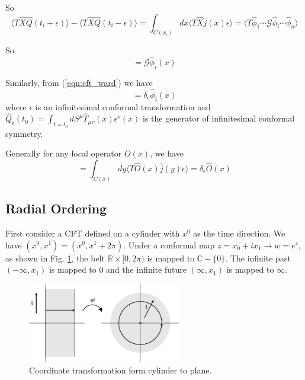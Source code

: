 \documentclass[12pt]{book}
\begin{document}
	So
	\begin{equation}
		\langle T\hat X\hat Q(t_{i}+\epsilon )\rangle-\langle T\hat X\hat Q(t_{i}-\epsilon)\rangle=\int_{C(x_i)}dx\langle T\hat X\hat j(x)\epsilon\rangle=\langle T\hat \phi_1\cdots\mathcal G\hat \phi_i\cdots\hat \phi_n\rangle
	\end{equation}
	
	So
	\begin{equation}
		[\hat Q(t),\hat \phi_i(x)]=\mathcal G\hat \phi_i(x)
	\end{equation}
	
	Similarly, from (\ref{eqn:cft_ward}) we have
	\begin{equation}
		[\hat Q_\epsilon(t),\hat \phi_i(x)]=\delta_\epsilon\hat \phi_i(x)
	\end{equation}
	where $\epsilon$ is an infinitesimal conformal transformation and $\hat Q_\epsilon(t_0)=\int_{t=t_0}dS^\mu \hat T_{\mu\nu}(x)\epsilon^\nu(x)$ is the generator of infinitesimal conformal symmetry.
	
	Generally for any local operator $O(x)$, we have
	\begin{equation}
		[\hat Q_\epsilon(t),\hat O(x)]=\int_{C(x)}dy\langle T\hat O(x)\hat j(y)\epsilon\rangle=\delta_\epsilon\hat O(x)
	\end{equation}
	\subsection{Radial Ordering}
	
	First consider a CFT defined on a cylinder with $x^0$ as the time direction. We have $(x^0,x^1)=(x^0,x^1+2\pi)$. 
	Under a conformal map $z=x_0+ix_1 \rightarrow w=e^z$, as shown in Fig. \ref{fig:radial}, the belt $\mathbb R\times[0,2\pi)$ is mapped to $\mathbb C-\{0\}$. The infinite past $(-\infty,x_1)$ is mapped to $0$ and the infinite future $(\infty,x_1)$ is mapped to $\infty$.
	
	\begin{figure}[htb]
		\centering  
		\includegraphics[width=0.6\textwidth]{resources/chap_cft/radial8.pdf}
		\caption{Coordinate transformation form cylinder to plane.}
		\label{fig:radial} 
	\end{figure}
	
\end{document}
